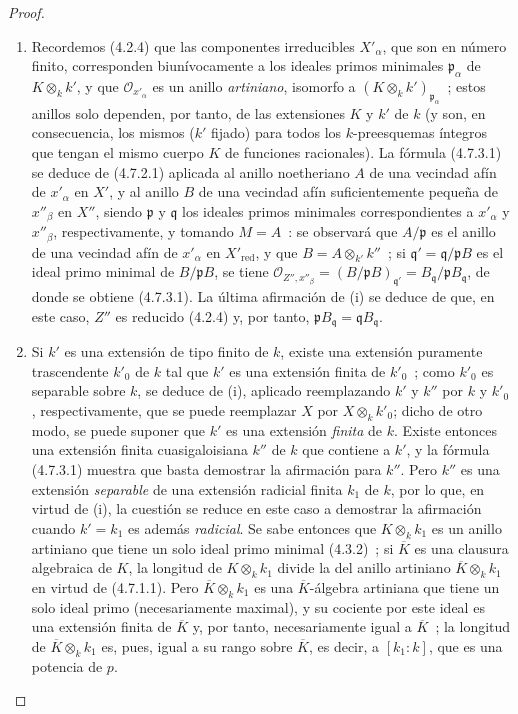 \begin{proof}
\begin{enumerate}
\item[(i)] Recordemos (4.2.4) que las componentes irreducibles $X'_\alpha$,
que son en número finito, corresponden biunívocamente a los ideales primos
minimales $\mathfrak p_\alpha$ de $K\otimes_k k'$, y que
$\mathcal O_{x'_\alpha}$ es un anillo \emph{artiniano}, isomorfo a
$(K\otimes_k k')_{\mathfrak p_\alpha}$~; estos anillos solo dependen, por tanto,
de las extensiones $K$ y $k'$ de $k$ (y son, en consecuencia, los mismos
($k'$ fijado) para todos los $k$-preesquemas íntegros que tengan el mismo cuerpo
$K$ de funciones racionales). La fórmula (4.7.3.1) se deduce de (4.7.2.1)
aplicada al anillo noetheriano $A$ de una vecindad afín de $x'_\alpha$ en $X'$, y
al anillo $B$ de una vecindad afín suficientemente pequeña de $x''_\beta$ en
$X''$, siendo $\mathfrak p$ y $\mathfrak q$ los ideales primos minimales
correspondientes a $x'_\alpha$ y $x''_\beta$, respectivamente, y tomando $M=A$~:
se observará que $A/\mathfrak p$ es el anillo de una vecindad afín de $x'_\alpha$ en
$X'_{\mathrm{red}}$, y que $B=A\otimes_{k'}k''$~; si
$\mathfrak q'=\mathfrak q/\mathfrak pB$ es el ideal primo minimal de
$B/\mathfrak pB$, se tiene
$\mathcal O_{Z'',x''_\beta}
=(B/\mathfrak pB)_{\mathfrak q'}
=B_{\mathfrak q}/\mathfrak pB_{\mathfrak q}$,
de donde se obtiene (4.7.3.1). La última afirmación de (i) se deduce de que, en
este caso, $Z''$ es reducido (4.2.4) y, por tanto,
$\mathfrak pB_{\mathfrak q}=\mathfrak qB_{\mathfrak q}$.

\item[(ii)] Si $k'$ es una extensión de tipo finito de $k$, existe una
extensión puramente trascendente $k'_0$ de $k$ tal que $k'$ es una extensión
finita de $k'_0$~; como $k'_0$ es separable sobre $k$, se deduce de (i),
aplicado reemplazando $k'$ y $k''$ por $k$ y $k'_0$, respectivamente, que se
puede reemplazar $X$ por $X\otimes_k k'_0$; dicho de otro modo, se puede suponer
que $k'$ es una extensión \emph{finita} de $k$. Existe entonces una extensión finita
cuasigaloisiana $k''$ de $k$ que contiene a $k'$, y la fórmula (4.7.3.1)
muestra que basta demostrar la afirmación para $k''$. Pero $k''$ es una
extensión \emph{separable} de una extensión radicial finita $k_1$ de $k$, por lo que,
en virtud de (i), la cuestión se reduce en este caso a demostrar la afirmación
cuando $k'=k_1$ es además \emph{radicial}. Se sabe entonces que $K\otimes_k k_1$ es un
anillo artiniano que tiene un solo ideal primo minimal (4.3.2)~; si
$\overline K$ es una clausura algebraica de $K$, la longitud de
$K\otimes_k k_1$ divide la del anillo artiniano $\overline K\otimes_k k_1$ en
virtud de (4.7.1.1). Pero $\overline K\otimes_k k_1$ es una $\overline K$-álgebra
artiniana que tiene un solo ideal primo (necesariamente maximal), y su cociente
por este ideal es una extensión finita de $\overline K$ y, por tanto,
necesariamente igual a $\overline K$~; la longitud de
$\overline K\otimes_k k_1$ es, pues, igual a su rango sobre $\overline K$, es
decir, a $[k_1:k]$, que es una potencia de $p$.


\end{enumerate}
\end{proof}
